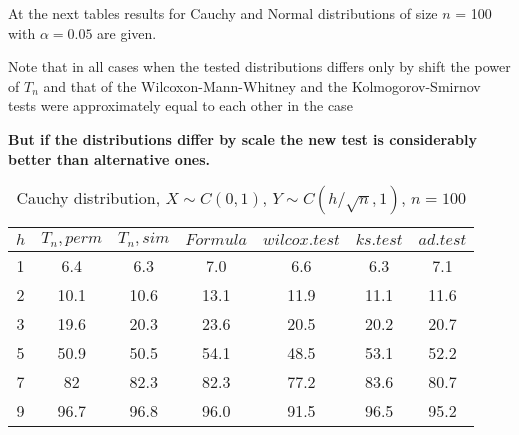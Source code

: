 \documentclass[slidestop,usepdftitle=false]{beamer}
\begin{document}
 \begin{slide}
 
 \bigskip

 At the next tables results for Cauchy and Normal distributions of size $n$ = 100 with $\alpha=0.05$ are given.

\bigskip

Note that in all cases when the tested distributions differs only by shift the power of  $T_n$ and  that of the Wilcoxon-Mann-Whitney and the
Kolmogorov-Smirnov tests were approximately equal to each other in the case 

\bigskip

{\bf But if the distributions differ by  scale the new test is considerably better than alternative ones.}

\end {slide}

\begin{slide}
\begin{table}[h!]
  \caption{Cauchy distribution, $X\sim C(0,1)$, $Y\sim C(h/\sqrt{n},1)$, $n=100$}
  \begin{center}
  \begin{tabular}{c@{\quad}c@{\quad}c@{\quad}c@{\quad}c@{\quad}c@{\quad}c}
  \hline
  $h$ & $T_n, perm$ & $T_n, sim$ & $Formula$ & $wilcox.test$ & $ks.test$ & $ad.test$ \\
  \hline
  1 & 6.4 & 6.3 & 7.0 & 6.6 & 6.3 & 7.1\\
  2 & 10.1 & 10.6 & 13.1 & 11.9 & 11.1 & 11.6 \\
  3 & 19.6 & 20.3 & 23.6 & 20.5 & 20.2 & 20.7 \\
  5 & 50.9 & 50.5 & 54.1 & 48.5 & 53.1 & 52.2 \\
  7 & 82 & 82.3 & 82.3 & 77.2 & 83.6 & 80.7 \\
  9 & 96.7 & 96.8 & 96.0 & 91.5 & 96.5 & 95.2 \\
  \hline
  \end{tabular}
  \end{center}
\end{table}
\end{slide}
\end{document}
